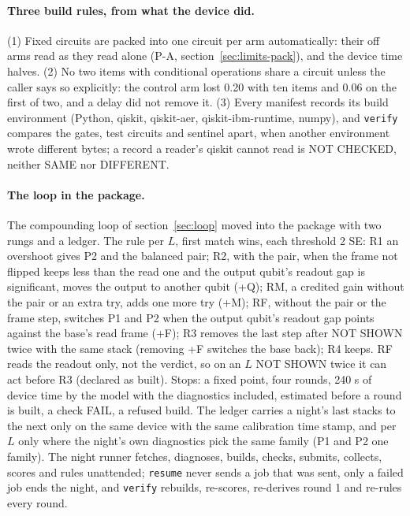 \documentclass[10pt,a4paper]{article}
\begin{document}
\paragraph{Three build rules, from what the device did.} (1) Fixed circuits are packed into one circuit per arm
automatically: their off arms read as they read alone (P-A, section~\ref{sec:limits-pack}), and the device time halves.
(2) No two items with conditional operations share a circuit unless the caller says so explicitly: the control arm lost
0.20 with ten items and 0.06 on the first of two, and a delay did not remove it. (3) Every manifest records its build
environment (Python, qiskit, qiskit-aer, qiskit-ibm-runtime, numpy), and \texttt{verify} compares the gates, test circuits and sentinel
apart, when another environment wrote different bytes; a record a reader's qiskit cannot read is NOT CHECKED, neither
SAME nor DIFFERENT.

\paragraph{The loop in the package.} The compounding loop of section~\ref{sec:loop} moved into the package with two
rungs and a ledger. The rule per $L$, first match wins, each threshold 2 SE: R1 an overshoot gives P2 and the balanced
pair; R2, with the pair, when the frame not flipped keeps less than the read one and the output qubit's readout gap is
significant, moves the output to another qubit (+Q); RM, a credited gain without the pair or an extra try, adds one
more try (+M); RF, without the pair or the frame step, switches P1 and P2 when the output qubit's readout gap points
against the base's read frame (+F); R3 removes the last step after NOT SHOWN twice with the same stack (removing +F switches the base back); R4 keeps. RF reads the readout only, not the verdict, so on an $L$ NOT SHOWN
twice it can act before R3 (declared as built). Stops: a
fixed point, four rounds, 240 s of device time by the model with the diagnostics included, estimated before a round
is built, a check FAIL, a refused
build. The ledger carries a night's last stacks to the next only on the same device with the same calibration time
stamp, and per $L$ only where the night's own diagnostics pick the same family (P1 and P2 one family). The night runner
fetches, diagnoses, builds, checks, submits, collects, scores and rules unattended; \texttt{resume} never sends a job
that was sent, only a failed job ends the night, and \texttt{verify} rebuilds, re-scores, re-derives round 1 and
re-rules every round.
\end{document}

